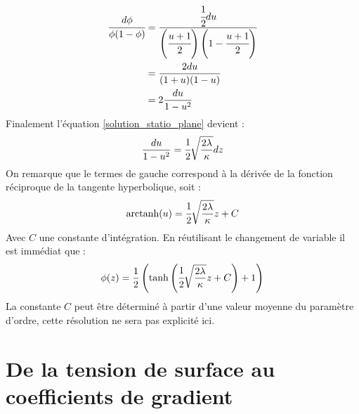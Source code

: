 \begin{appendix}
\begin{align*}
	 \cfrac{d\phi}{\phi(1-\phi)} &= \cfrac{\cfrac{1}{2}du}{\left(\cfrac{u+1}{2}\right)\left( 1 -\cfrac{u+1}{2}\right)} \\
	 & = \frac{2du}{(1+u)(1-u)} \\
	 & = 2\frac{du}{1-u^2}
\end{align*}
Finalement l'équation \ref{solution_statio_plane} devient :
\begin{equation}
	\frac{du}{1-u^2} = \cfrac{1}{2}\sqrt{\frac{2\lambda}{\kappa}}dz
\end{equation}
On remarque que le termes de gauche correspond à la dérivée de la fonction réciproque de la tangente hyperbolique, soit :
\begin{equation}
	\text{arctanh}(u) = \cfrac{1}{2}\sqrt{\frac{2\lambda}{\kappa}} z + C
\end{equation}
Avec $C$ une constante d'intégration.
En réutilisant le changement de variable il est immédiat que :
 \begin{equation}
 \phi(z) = \frac{1}{2}\left(\tanh \left(\cfrac{1}{2}\sqrt{\frac{2\lambda}{\kappa}}z +C\right)+1\right)
 \end{equation}
La constante $C$ peut être déterminé à partir d'une valeur moyenne du paramètre d'ordre, cette résolution ne sera pas explicité ici.

\chapter{De la tension de surface au coefficients de gradient}

\end{appendix}
